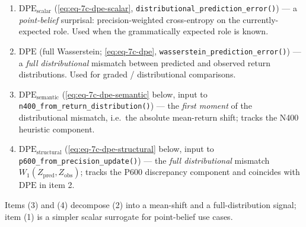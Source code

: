 \documentclass[
]{article}
\providecommand{\tightlist}{%
  \setlength{\itemsep}{0pt}\setlength{\parskip}{0pt}}
\begin{document}
\begin{enumerate}
\def\labelenumi{\arabic{enumi}.}
\tightlist
\item
  \(\mathrm{DPE}_{\text{scalar}}\) (\autoref{eq:eq-7c-dpe-scalar},
  \texttt{distributional\_prediction\_error()}) --- a
  \emph{point-belief} surprisal: precision-weighted cross-entropy on the
  currently-expected role. Used when the grammatically expected role is
  known.
\item
  \(\mathrm{DPE}\) (full Wasserstein; \autoref{eq:eq-7c-dpe},
  \texttt{wasserstein\_prediction\_error()}) --- a \emph{full
  distributional} mismatch between predicted and observed return
  distributions. Used for graded / distributional comparisons.
\item
  \(\mathrm{DPE}_{\text{semantic}}\) (\autoref{eq:eq-7c-dpe-semantic}
  below, input to \texttt{n400\_from\_return\_distribution()}) --- the
  \emph{first moment} of the distributional mismatch, i.e.~the absolute
  mean-return shift; tracks the N400 heuristic component.
\item
  \(\mathrm{DPE}_{\text{structural}}\)
  (\autoref{eq:eq-7c-dpe-structural} below, input to
  \texttt{p600\_from\_precision\_update()}) --- the \emph{full
  distributional} mismatch \(W_1(Z_{\text{pred}}, Z_{\text{obs}})\);
  tracks the P600 discrepancy component and coincides with
  \(\mathrm{DPE}\) in item 2.
\end{enumerate}

Items (3) and (4) decompose (2) into a mean-shift and a
full-distribution signal; item (1) is a simpler scalar surrogate for
point-belief use cases.
\end{document}
